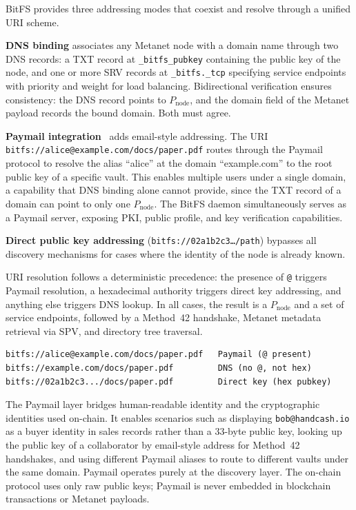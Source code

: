 \documentclass[11pt,a4paper]{article}
\begin{document}
BitFS provides three addressing modes that coexist and resolve through a unified URI scheme.

\textbf{DNS binding} associates any Metanet node with a domain name through two DNS records: a TXT record at \texttt{\_bitfs\_pubkey} containing the public key of the node, and one or more SRV records at \texttt{\_bitfs.\_tcp} specifying service endpoints with priority and weight for load balancing. Bidirectional verification ensures consistency: the DNS record points to $P_{\text{node}}$, and the domain field of the Metanet payload records the bound domain. Both must agree.

\textbf{Paymail integration}~\cite{paymail} adds email-style addressing. The URI \texttt{bitfs://alice@example.com/docs/paper.pdf} routes through the Paymail protocol to resolve the alias ``alice'' at the domain ``example.com'' to the root public key of a specific vault. This enables multiple users under a single domain, a capability that DNS binding alone cannot provide, since the TXT record of a domain can point to only one $P_{\text{node}}$. The BitFS daemon simultaneously serves as a Paymail server, exposing PKI, public profile, and key verification capabilities.

\textbf{Direct public key addressing} (\texttt{bitfs://02a1b2c3\ldots/path}) bypasses all discovery mechanisms for cases where the identity of the node is already known.

URI resolution follows a deterministic precedence: the presence of \texttt{@} triggers Paymail resolution, a hexadecimal authority triggers direct key addressing, and anything else triggers DNS lookup. In all cases, the result is a $P_{\text{node}}$ and a set of service endpoints, followed by a Method~42 handshake, Metanet metadata retrieval via SPV, and directory tree traversal.

\begin{lstlisting}
bitfs://alice@example.com/docs/paper.pdf   Paymail (@ present)
bitfs://example.com/docs/paper.pdf         DNS (no @, not hex)
bitfs://02a1b2c3.../docs/paper.pdf         Direct key (hex pubkey)
\end{lstlisting}

The Paymail layer bridges human-readable identity and the cryptographic identities used on-chain. It enables scenarios such as displaying \texttt{bob@handcash.io} as a buyer identity in sales records rather than a 33-byte public key, looking up the public key of a collaborator by email-style address for Method~42 handshakes, and using different Paymail aliases to route to different vaults under the same domain. Paymail operates purely at the discovery layer. The on-chain protocol uses only raw public keys; Paymail is never embedded in blockchain transactions or Metanet payloads.
\end{document}
